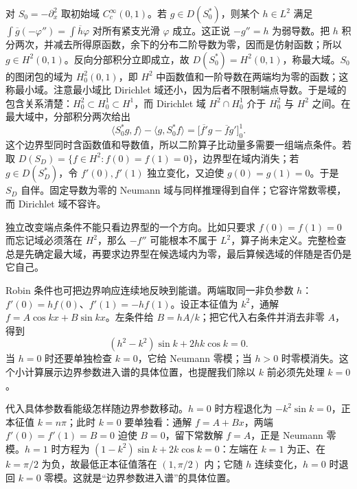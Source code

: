 对 \(S_0=-\partial_x^2\) 取初始域 \(C_c^\infty(0,1)\)。若 \(g\in D(S_0^*)\)，则某个 \(h\in L^2\) 满足 \(\int\overline g(-\varphi'')=\int\overline h\varphi\) 对所有紧支光滑 \(\varphi\) 成立。这正说 \(-g''=h\) 为弱导数。把 \(h\) 积分两次，并减去所得原函数，余下的分布二阶导数为零，因而是仿射函数；所以 \(g\in H^2(0,1)\)。反向分部积分立即成立，故 \(D(S_0^*)=H^2(0,1)\)，称最大域。\(S_0\) 的图闭包的域为 \(H_0^2(0,1)\)，即 \(H^2\) 中函数值和一阶导数在两端均为零的函数；这称最小域。注意最小域比 Dirichlet 域还小，因为后者不限制端点导数。于是域的包含关系清楚：\(H_0^2\subset H_0^1\subset H^1\)，而 Dirichlet 域 \(H^2\cap H_0^1\) 介于 \(H_0^2\) 与 \(H^2\) 之间。在最大域中，分部积分两次给出
\[
\langle S_0^*g,f\rangle-\langle g,S_0^*f\rangle
=\bigl[\overline{f'}g-\overline f g'\bigr]_0^1.
\]
这个边界型同时含函数值和导数值，所以二阶算子比动量多需要一组端点条件。若取 \(D(S_D)=\{f\in H^2:f(0)=f(1)=0\}\)，边界型在域内消失；若 \(g\in D(S_D^*)\)，令 \(f'(0),f'(1)\) 独立变化，又迫使 \(g(0)=g(1)=0\)。于是 \(S_D\) 自伴。固定导数为零的 Neumann 域与同样推理得到自伴；它容许常数零模，而 Dirichlet 域不容许。

独立改变端点条件不能只看边界型的一个方向。比如只要求 \(f(0)=f(1)=0\) 而忘记域必须落在 \(H^2\)，那么 \(-f''\) 可能根本不属于 \(L^2\)，算子尚未定义。完整检查总是先确定最大域，再要求边界型在候选域内为零，最后算候选域的伴随是否仍是它自己。

Robin 条件也可把边界响应连续地反映到能谱。两端取同一非负参数 \(h\)：\(f'(0)=hf(0)\)、\(f'(1)=-hf(1)\)。设正本征值为 \(k^2\)，通解 \(f=A\cos kx+B\sin kx\)。左条件给 \(B=hA/k\)；把它代入右条件并消去非零 \(A\)，得到
\[
(h^2-k^2)\sin k+2hk\cos k=0.
\]
当 \(h=0\) 时还要单独检查 \(k=0\)，它给 Neumann 零模；当 \(h>0\) 时零模消失。这个小计算展示边界参数进入谱的具体位置，也提醒我们除以 \(k\) 前必须先处理 \(k=0\)。

代入具体参数看能级怎样随边界参数移动。\(h=0\) 时方程退化为 \(-k^2\sin k=0\)，正本征值 \(k=n\pi\)；此时 \(k=0\) 要单独看：通解 \(f=A+Bx\)，两端 \(f'(0)=f'(1)=B=0\) 迫使 \(B=0\)，留下常数解 \(f=A\)，正是 Neumann 零模。\(h=1\) 时方程为 \((1-k^2)\sin k+2k\cos k=0\)：左端在 \(k=1\) 为正、在 \(k=\pi/2\) 为负，故最低正本征值落在 \((1,\pi/2)\) 内；它随 \(h\) 连续变化，\(h=0\) 时退回 \(k=0\) 零模。这就是“边界参数进入谱”的具体位置。


